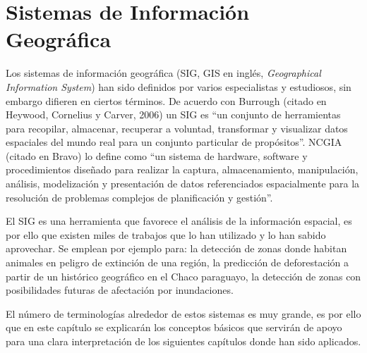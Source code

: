 \chapter{Sistemas de Información Geográfica}
\label{chap3}
\ifpdf
    \graphicspath{{Chapter3/Chapter3Figs/PNG/}{Chapter3/Chapter3Figs/PDF/}{Chapter3/Chapter3Figs/}}
\else
    \graphicspath{{Chapter3/Chapter3Figs/EPS/}{Chapter3/Chapter3Figs/}}
\fi


Los sistemas de información geográfica (SIG, GIS en inglés, \textit{Geographical Information System}) han sido definidos por varios especialistas y estudiosos, sin embargo difieren en ciertos términos. De acuerdo con Burrough (citado en Heywood, Cornelius y Carver, 2006) un SIG es “un conjunto de herramientas para recopilar, almacenar, recuperar a voluntad, transformar y visualizar datos espaciales del mundo real para un conjunto particular de propósitos”. NCGIA (citado en Bravo) lo define como “un sistema de hardware, software y procedimientos diseñado para realizar la captura, almacenamiento, manipulación, análisis, modelización y presentación de datos referenciados espacialmente para la resolución de problemas complejos de planificación y gestión”.

El SIG es una herramienta que favorece el análisis de la información espacial, es por ello que existen miles de trabajos que lo han utilizado y lo han sabido aprovechar. Se emplean por ejemplo para: la detección de zonas donde habitan animales en peligro de extinción de una región, la predicción de deforestación a partir de un histórico geográfico en el Chaco paraguayo, la detección de zonas con posibilidades futuras de afectación por inundaciones.

El número de terminologías alrededor de estos sistemas es muy grande, es por ello que en este capítulo se explicarán los conceptos básicos que servirán de apoyo para una clara interpretación de los siguientes capítulos donde han sido aplicados.



